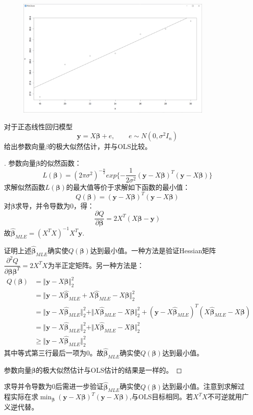 \documentclass[cn,hazy,green,12pt,normal]{elegantnote}
\newcommand{\p}{\partial}
\numberwithin{equation}{section}
\numberwithin{subsection}{section}
\begin{document}
\begin{figure}[!htbp]
    \centering
    \includegraphics[width=26em]{image/ex1_plt1.png}
\end{figure}
\begin{homework}
    对于正态线性回归模型
\[\bm y=X\bm \beta +e, \qquad e \sim N(0,\sigma^2 I_n)\]
给出参数向量$\beta$的极大似然估计，并与OLS比较。
\end{homework}
\begin{proof}[\solutionname]
    参数向量$\bm \beta$的似然函数：
    $$
    L(\bm \beta )=(2\pi \sigma^2)^{-\frac{n}{2}} exp\{-\frac{1}{2\sigma^2}(\bm y-X\bm \beta)^T(\bm y-X\bm \beta)\}
    $$
    求解似然函数$L(\bm \beta)$的最大值等价于求解如下函数的最小值：
    $$
    Q(\bm \beta) = (\bm y-X\bm \beta)^T(\bm y-X\bm \beta)
    $$
    对$\bm \beta$求导，并令导数为0，得：
    $$
    \dfrac{\p Q}{\p \bm \beta}=2X^T(X\bm \beta -\bm y)
    $$
    故$\hat{\bm \beta}_{MLE}=(X^TX)^{-1}X^T\bm y$.

    证明上述$\hat{\bm \beta}_{MLE}$确实使$Q(\bm \beta)$达到最小值。一种方法是验证Hessian矩阵$\dfrac{\p^2 Q}{\p \bm \beta \bm \beta^T}=2X^TX$为半正定矩阵。另一种方法是：
    $$
    \begin{aligned}
         Q(\bm \beta) &= \Vert \bm y-X\bm \beta \Vert_2^2 \\
         &= \Vert \bm y- X\hat{\bm \beta}_{MLE} + X\hat{\bm \beta}_{MLE} -X\bm \beta \Vert_2^2 \\
         &= \Vert \bm y- X\hat{\bm \beta}_{MLE} \Vert_2^2 + \Vert X\hat{\bm \beta}_{MLE} -X\bm \beta \Vert_2^2 + (\bm y- X\hat{\bm \beta}_{MLE})^T(X\hat{\bm \beta}_{MLE} -X\bm \beta) \\
         &= \Vert \bm y- X\hat{\bm \beta}_{MLE} \Vert_2^2 + \Vert X\hat{\bm \beta}_{MLE} -X\bm \beta \Vert_2^2 \\
         &\geq \Vert \bm y- X\hat{\bm \beta}_{MLE} \Vert_2^2
    \end{aligned}
    $$
    其中等式第三行最后一项为0。故$\hat{\bm \beta}_{MLE}$确实使$Q(\bm \beta)$达到最小值。

    参数向量$\bm \beta$的极大似然估计与OLS估计的结果是一样的。
\end{proof}
\begin{note}
    求导并令导数为0后需进一步验证$\hat{\bm \beta}_{MLE}$确实使$Q(\bm \beta)$达到最小值。注意到求解过程实际在求$\min_{\bm \beta} (\bm y-X\bm \beta)^T(\bm y-X\bm \beta)$,与OLS目标相同。若$X^TX$不可逆就用广义逆代替。
\end{note}
\end{document}
